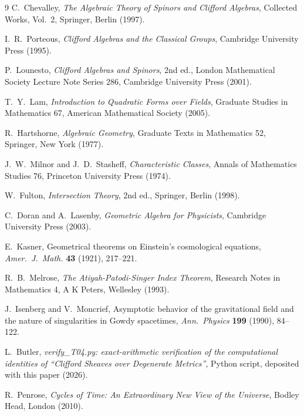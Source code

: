 \documentclass[11pt]{article}
\theoremstyle{definition}
\begin{document}
\begin{thebibliography}{9}
C.~Chevalley,
\emph{The Algebraic Theory of Spinors and Clifford Algebras},
Collected Works, Vol.~2, Springer, Berlin (1997).

I.~R.~Porteous,
\emph{Clifford Algebras and the Classical Groups},
Cambridge University Press (1995).

P.~Lounesto,
\emph{Clifford Algebras and Spinors}, 2nd ed.,
London Mathematical Society Lecture Note Series 286, Cambridge University Press (2001).

T.~Y.~Lam,
\emph{Introduction to Quadratic Forms over Fields},
Graduate Studies in Mathematics 67, American Mathematical Society (2005).

R.~Hartshorne,
\emph{Algebraic Geometry},
Graduate Texts in Mathematics 52, Springer, New York (1977).

J.~W.~Milnor and J.~D.~Stasheff,
\emph{Characteristic Classes},
Annals of Mathematics Studies 76, Princeton University Press (1974).

W.~Fulton,
\emph{Intersection Theory}, 2nd ed.,
Springer, Berlin (1998).

C.~Doran and A.~Lasenby,
\emph{Geometric Algebra for Physicists},
Cambridge University Press (2003).

E.~Kasner,
Geometrical theorems on Einstein's cosmological equations,
\emph{Amer.\ J.\ Math.} \textbf{43} (1921), 217--221.

R.~B.~Melrose,
\emph{The Atiyah-Patodi-Singer Index Theorem},
Research Notes in Mathematics 4, A K Peters, Wellesley (1993).

J.~Isenberg and V.~Moncrief,
Asymptotic behavior of the gravitational field and the nature of singularities in Gowdy spacetimes,
\emph{Ann.\ Physics} \textbf{199} (1990), 84--122.

L.~Butler,
\emph{verify\_T04.py: exact-arithmetic verification of the computational identities of ``Clifford Sheaves over Degenerate Metrics''},
Python script, deposited with this paper (2026).

R.~Penrose,
\emph{Cycles of Time: An Extraordinary New View of the Universe},
Bodley Head, London (2010).

\end{thebibliography}
\end{document}
